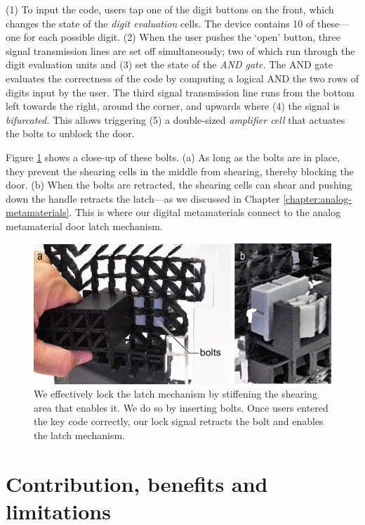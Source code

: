 (1) To input the code, users tap one of the digit buttons on the front, which changes the state of the \textit{digit evaluation} cells. The device contains 10 of these---one for each possible digit. (2) When the user pushes the `open' button, three signal transmission lines are set off simultaneously; two of which run through the digit evaluation units and (3) set the state of the \textit{AND gate.} The AND gate evaluates the correctness of the code by computing a logical AND the two rows of digits input by the user. The third signal transmission line runs from the bottom left towards the right, around the corner, and upwards where (4) the signal is \textit{bifurcated.} This allows triggering (5) a double-sized \textit{amplifier cell} that actuates the bolts to unblock the door.

Figure \ref{fig:6-bolts} shows a close-up of these bolts. (a) As long as the bolts are in place, they prevent the shearing cells in the middle from shearing, thereby blocking the door. (b) When the bolts are retracted, the shearing cells can shear and pushing down the handle retracts the latch---as we discussed in Chapter \ref{chapter:analog-metamaterials}. This is where our digital metamaterials connect to the analog metamaterial door latch mechanism.

\begin{figure} [h]  
    \includegraphics[width=\textwidth]{chapters/digital-metamaterials-FIG/6-bolts.pdf}
    \caption[Short figure name.]{We effectively lock the latch mechanism by stiffening the shearing area that enables it. We do so by inserting bolts. Once users entered the key code correctly, our lock signal retracts the bolt and enables the latch mechanism.
    \label{fig:6-bolts}}
\end{figure}


\section{Contribution, benefits and limitations}

